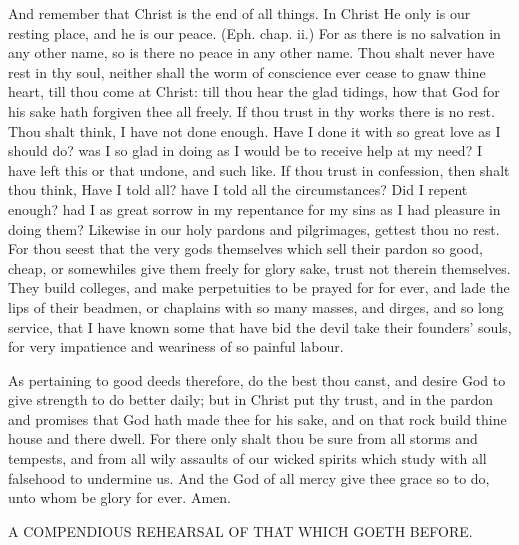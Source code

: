 And remember that Christ is the end of all things. In Christ 
He only is our resting place, and he is our peace.
(Eph. chap. ii.) For as there is no salvation in any other
name, so is there no peace in any other name. Thou 
shalt never have rest in thy soul, neither shall the worm of 
conscience ever cease to gnaw thine heart, till thou come 
at Christ: till thou hear the glad tidings, how that God 
for his sake hath forgiven thee all freely. If thou trust in 
thy works there is no rest. Thou shalt think, I have not 
done enough. Have I done it with so great love as I 
should do? was I so glad in doing as I would be to receive
help at my need? I have left this or that undone, and 
such like. If thou trust in confession, then shalt thou 
think, Have I told all? have I told all the circumstances?
Did I repent enough? had I as great sorrow in 
my repentance for my sins as I had pleasure in doing them? 
Likewise in our holy pardons and pilgrimages, gettest thou 
no rest. For thou seest that the very gods themselves 
which sell their pardon so good, cheap, or somewhiles 
give them freely for glory sake, trust not therein themselves.
They build colleges, and make perpetuities to be 
prayed for for ever, and lade the lips of their beadmen, 
or chaplains with so many masses, and dirges, and so long 
service, that I have known some that have bid the devil 
take their founders' souls, for very impatience and weariness
of so painful labour. 

As pertaining to good deeds therefore, do the best
thou canst, and desire God to give strength to do better
daily; but in Christ put thy trust, and in the pardon
and promises that God hath made thee for his sake, and 
on that rock build thine house and there dwell. For there 
only shalt thou be sure from all storms and tempests, and 
from all wily assaults of our wicked spirits which study with 
all falsehood to undermine us. And the God of all mercy 
give thee grace so to do, unto whom be glory for ever. Amen. 


A COMPENDIOUS REHEARSAL OF THAT WHICH 
GOETH BEFORE. 

